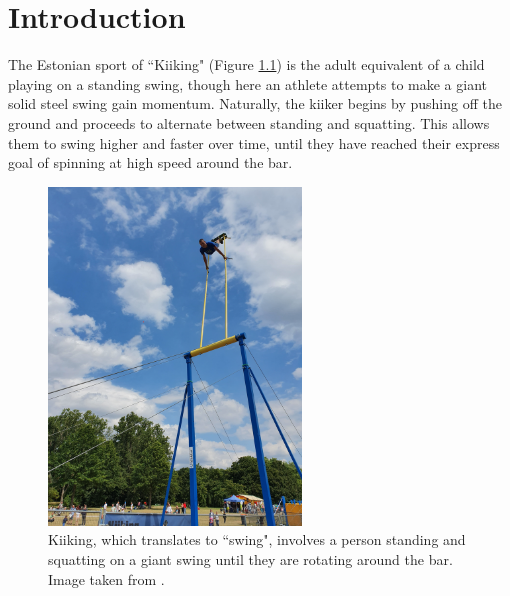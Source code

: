 

\chapter{Introduction}

The Estonian sport of ``Kiiking" (Figure \ref{fig:kiiking}) is the adult
equivalent of a child playing on a standing swing, though here
an athlete attempts to make a giant solid steel swing gain momentum.
Naturally, the kiiker begins by pushing off the ground and proceeds to alternate
between standing and squatting. 
This allows them to swing higher and faster over time, until they have reached
their express goal of spinning at high speed around the bar.

\begin{figure}[ht]
    \centering
    \includegraphics[width=0.6\textwidth,angle=270]{images/kiiking.jpg}
    \caption{Kiiking, which translates to ``swing", involves a person standing
        and squatting on a giant swing until they are rotating around the bar.
    Image taken from \cite{kiiking-img}.}
    \label{fig:kiiking}
\end{figure}

